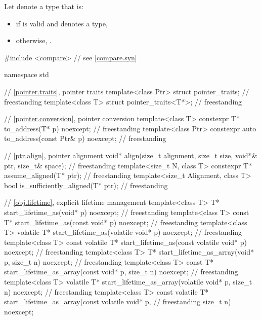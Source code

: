 \pnum
Let  denote a type that is:
\begin{itemize}
\item
{}
if  is valid and denotes a type,
\item
otherwise, .
\end{itemize}

\begin{codeblock}
#include <compare>              // see \ref{compare.syn}

namespace std {
  // \ref{pointer.traits}, pointer traits
  template<class Ptr> struct pointer_traits;                                        // freestanding
  template<class T> struct pointer_traits<T*>;                                      // freestanding

  // \ref{pointer.conversion}, pointer conversion
  template<class T>
    constexpr T* to_address(T* p) noexcept;                                         // freestanding
  template<class Ptr>
    constexpr auto to_address(const Ptr& p) noexcept;                               // freestanding

  // \ref{ptr.align}, pointer alignment
  void* align(size_t alignment, size_t size, void*& ptr, size_t& space);            // freestanding
  template<size_t N, class T>
    constexpr T* assume_aligned(T* ptr);                                            // freestanding
  template<size_t Alignment, class T>
    bool is_sufficiently_aligned(T* ptr);                                           // freestanding

  // \ref{obj.lifetime}, explicit lifetime management
  template<class T>
    T* start_lifetime_as(void* p) noexcept;                                         // freestanding
  template<class T>
    const T* start_lifetime_as(const void* p) noexcept;                             // freestanding
  template<class T>
    volatile T* start_lifetime_as(volatile void* p) noexcept;                       // freestanding
  template<class T>
    const volatile T* start_lifetime_as(const volatile void* p) noexcept;           // freestanding
  template<class T>
    T* start_lifetime_as_array(void* p, size_t n) noexcept;                         // freestanding
  template<class T>
    const T* start_lifetime_as_array(const void* p, size_t n) noexcept;             // freestanding
  template<class T>
    volatile T* start_lifetime_as_array(volatile void* p, size_t n) noexcept;       // freestanding
  template<class T>
    const volatile T* start_lifetime_as_array(const volatile void* p,               // freestanding
	                                      size_t n) noexcept;

}
\end{codeblock}
